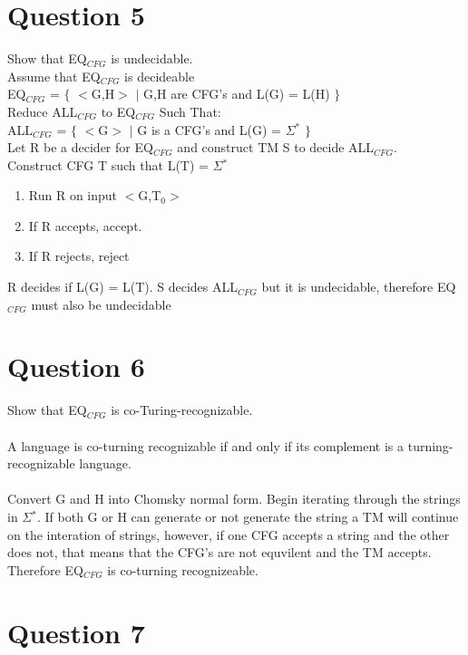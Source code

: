 \documentclass[10pt,a4paper]{article}
\begin{document}
\section*{Question 5}
Show that EQ$_{CFG}$ is undecidable.\\
Assume that EQ$_{CFG}$ is decideable\\
EQ$_{CFG}$ = $\lbrace$ $<$G,H$>$ $\mid$ G,H are CFG's and L(G) = L(H) $\rbrace$
\\
Reduce ALL$_{CFG}$ to EQ$_{CFG}$ Such That:
\\
ALL$_{CFG}$ = $\lbrace$ $<$G$>$ $\mid$ G is a CFG's and L(G) = $\Sigma$$^{\ast}$ $\rbrace$
\\
Let R be a decider for EQ$_{CFG}$ and construct TM S to decide ALL$_{CFG}$.
\\
Construct CFG T such that L(T) = $\Sigma$$^{\ast}$
\begin{enumerate}
  \item Run R on input $<$G,T$_{0}$$>$
  \item If R accepts, accept.
  \item If R rejects, reject 
\end{enumerate}
R decides if L(G) = L(T). S decides ALL$_{CFG}$ but it is undecidable, therefore EQ$_{CFG}$ must also be undecidable 

\section*{Question 6}
Show that EQ$_{CFG}$ is co-Turing-recognizable.\\\\
A language is co-turning recognizable if and only if its complement is a turning-recognizable language.\\
\\
Convert G and H into Chomsky normal form. Begin iterating through the strings in $\Sigma$$^{\ast}$. If both G or H can generate or not generate the string a TM will continue on the interation of strings, however, if one CFG accepts a string and the other does not, that means that the CFG's are not equvilent and the TM accepts. Therefore EQ$_{CFG}$  is co-turning recognizeable.
\section*{Question 7}
\end{document}
